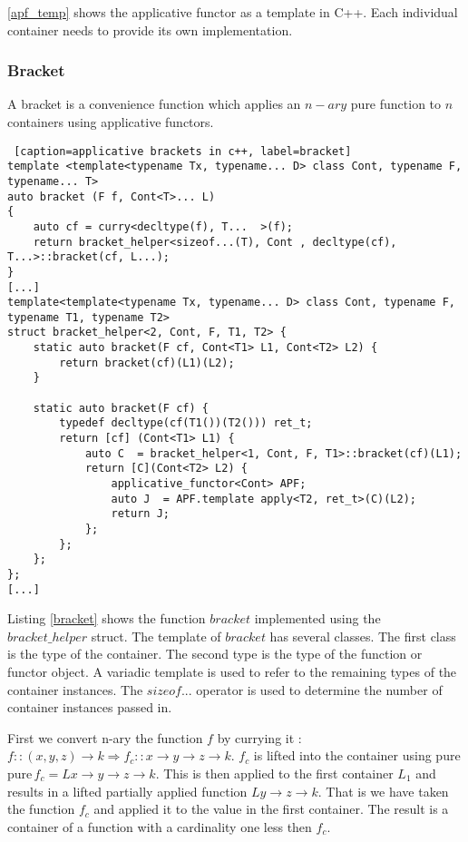 \documentclass[12pt,fleqn]{article}
\begin{document}
\ref{apf_temp} shows the applicative functor as a template in C++. 
Each individual container needs to provide its own implementation. 
%
%
%

%
%
%
\subsubsection{Bracket}
%
%

A bracket is a convenience function which applies an $n-ary$ pure function to $n$ containers using applicative functors.

%
%
%
\begin {lstlisting} [caption=applicative brackets in c++, label=bracket]
template <template<typename Tx, typename... D> class Cont, typename F, typename... T> 
auto bracket (F f, Cont<T>... L) 
{
	auto cf = curry<decltype(f), T...  >(f);	
	return bracket_helper<sizeof...(T), Cont , decltype(cf), T...>::bracket(cf, L...);
} 
[...]
template<template<typename Tx, typename... D> class Cont, typename F, typename T1, typename T2>
struct bracket_helper<2, Cont, F, T1, T2> {
	static auto bracket(F cf, Cont<T1> L1, Cont<T2> L2) {
		return bracket(cf)(L1)(L2);
	}

	static auto bracket(F cf) {
		typedef decltype(cf(T1())(T2())) ret_t;
		return [cf] (Cont<T1> L1) {
			auto C  = bracket_helper<1, Cont, F, T1>::bracket(cf)(L1);
			return [C](Cont<T2> L2) { 
				applicative_functor<Cont> APF;
				auto J  = APF.template apply<T2, ret_t>(C)(L2);
				return J;
			};
		};
	};
};
[...]
\end{lstlisting}
%
%
%
%
%

Listing \ref{bracket} shows the function $bracket$ implemented using the $bracket\_helper$ struct. 
The template of $bracket$ has several classes.
The first class is the type of the container. The second type is the type of the function or functor object.
A variadic template is used to refer to the remaining types of the container instances. 
The $sizeof...$ operator is used to determine the number of container instances passed in.


First we convert n-ary the function $f$ by currying it : $f::(x,y,z) \rightarrow k \Rightarrow f_c::x \rightarrow y \rightarrow z \rightarrow k$. 
$f_c$ is lifted into the container using pure $ \mbox{pure} \, f_c = L x \rightarrow y \rightarrow z \rightarrow k$. 
This is  then applied to the first container $L_1$ and results in a lifted partially applied function $L y \rightarrow z \rightarrow k$. 
That is we have taken the function $f_c$ and applied it to the value in the first container. The result is a container of a function 
with a cardinality one less then $f_c$.
\end{document}
